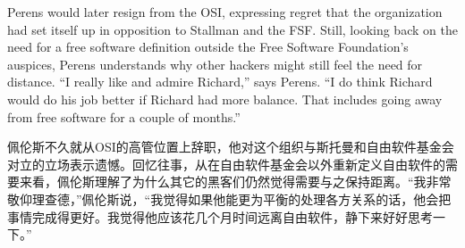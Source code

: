 




\ifdefined\eng
Perens would later resign from the OSI, expressing regret that the organization had set itself up in opposition to Stallman and the FSF. Still, looking back on the need for a free software definition outside the Free Software Foundation's auspices, Perens understands why other hackers might still feel the need for distance. ``I really like and admire Richard,'' says Perens. ``I do think Richard would do his job better if Richard had more balance. That includes going away from free software for a couple of months.''
\fi

\ifdefined\chs
佩伦斯不久就从OSI的高管位置上辞职，他对这个组织与斯托曼和自由软件基金会对立的立场表示遗憾。回忆往事，从在自由软件基金会以外重新定义自由软件的需要来看，佩伦斯理解了为什么其它的黑客们仍然觉得需要与之保持距离。``我非常敬仰理查德，''佩伦斯说，``我觉得如果他能更为平衡的处理各方关系的话，他会把事情完成得更好。我觉得他应该花几个月时间远离自由软件，静下来好好思考一下。''
\fi


